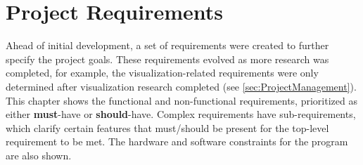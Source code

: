 
\newcommand{\must}[0]{\textbf{must}}
\newcommand{\should}[0]{\textbf{should}}
\newcommand{\shouldnt}[0]{\textbf{should not}}


\chapter{Project Requirements}
\label{sec:Requirements}
Ahead of initial development, a set of requirements were created to further specify the project goals.
These requirements evolved as more research was completed, for example, the visualization-related requirements were only determined after visualization research completed (see \cref{sec:ProjectManagement}).
This chapter shows the functional and non-functional requirements, prioritized as either \must{}-have or \should{}-have.
Complex requirements have sub-requirements, which clarify certain features that must/should be present for the top-level requirement to be met.
The hardware and software constraints for the program are also shown.






\pagebreak

